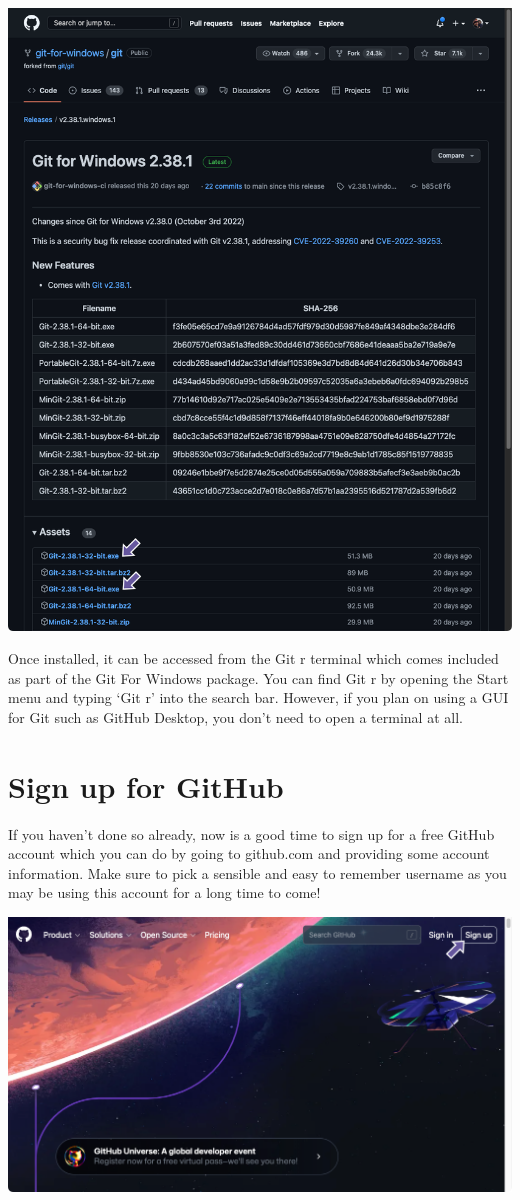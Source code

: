 \documentclass[
  letterpaper,
  DIV=11,
  numbers=noendperiod]{scrartcl}
\begin{document}
\includegraphics{images/image1.png}

Once installed, it can be accessed from the Git r terminal which comes
included as part of the Git For Windows package. You can find Git r by
opening the Start menu and typing `Git r' into the search bar. However,
if you plan on using a GUI for Git such as GitHub Desktop, you don't
need to open a terminal at all.

\section{Sign up for GitHub}\label{sign-up-for-github}

If you haven't done so already, now is a good time to sign up for a free
GitHub account which you can do by going to github.com and providing
some account information. Make sure to pick a sensible and easy to
remember username as you may be using this account for a long time to
come!

\includegraphics{images/image2.png}
\end{document}
